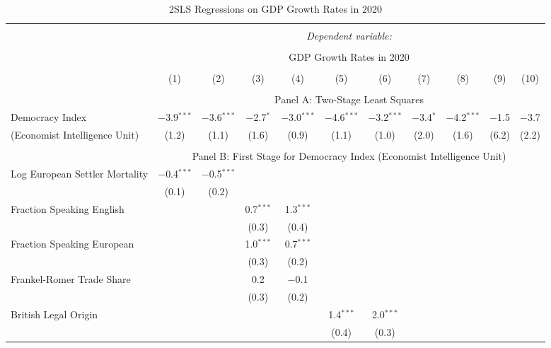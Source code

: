 
\begin{table}[!htbp] 
  \caption{2SLS Regressions on GDP Growth Rates in 2020} \centering
  \label{tab:2sls-gdp-economist} 
  \footnotesize
  \begin{threeparttable}
\begin{tabular}{@{\extracolsep{0pt}}lcccccccccc} 
\\[-1.8ex]\hline 
\hline \\[-1.8ex] 
 & \multicolumn{10}{c}{\textit{Dependent variable:}} \\ 
\cline{2-11} 
\\[-1.8ex] & \multicolumn{10}{c}{GDP Growth Rates in 2020} \\ 
\\[-1.8ex] & (1) & (2) & (3) & (4) & (5) & (6) & (7) & (8) & (9) & (10)\\ 
\hline \\[-1.8ex] 
  & \multicolumn{10}{c}{Panel A: Two-Stage Least Squares} \\
  Democracy Index & $-$3.9$^{***}$ & $-$3.6$^{***}$ & $-$2.7$^{*}$ & $-$3.0$^{***}$ & $-$4.6$^{***}$ & $-$3.2$^{***}$ & $-$3.4$^{*}$ & $-$4.2$^{***}$ & $-$1.5 & $-$3.7 \\ 
  (Economist Intelligence Unit) & (1.2) & (1.1) & (1.6) & (0.9) & (1.1) & (1.0) & (2.0) & (1.6) & (6.2) & (2.2) \\ 
 \hline \\[-1.8ex] 
   & \multicolumn{10}{c}{Panel B: First Stage for Democracy Index (Economist Intelligence Unit)} \\
    Log European Settler Mortality & $-$0.4$^{***}$ & $-$0.5$^{***}$ &  &  &  &  &  &  &  &  \\ 
  & (0.1) & (0.2) &  &  &  &  &  &  &  &  \\ 
  Fraction Speaking English &  &  & 0.7$^{***}$ & 1.3$^{***}$ &  &  &  &  &  &  \\ 
  &  &  & (0.3) & (0.4) &  &  &  &  &  &  \\ 
  Fraction Speaking European &  &  & 1.0$^{***}$ & 0.7$^{***}$ &  &  &  &  &  &  \\ 
  &  &  & (0.3) & (0.2) &  &  &  &  &  &  \\ 
  Frankel-Romer Trade Share &  &  & 0.2 & $-$0.1 &  &  &  &  &  &  \\ 
  &  &  & (0.3) & (0.2) &  &  &  &  &  &  \\ 
  British Legal Origin &  &  &  &  & 1.4$^{***}$ & 2.0$^{***}$ &  &  &  &  \\ 
  &  &  &  &  & (0.4) & (0.3) &  &  &  &  \\ 

\end{tabular}
\end{threeparttable}
\end{table}
